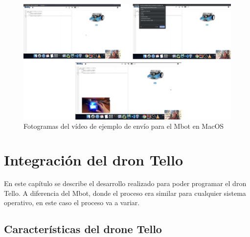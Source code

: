 \documentclass{report}
\begin{document}
\begin{figure}[h!]
  \centering
    \includegraphics[width=1\textwidth]{images/fotogramas_mbot.png}
  \caption{Fotogramas del vídeo de ejemplo de envío para el Mbot en MacOS}
  \label{Fotogramas del vídeo de ejemplo de envío para el Mbot en MacOS}
\end{figure}








\chapter{Integración del dron Tello}

En este capítulo se describe el desarrollo realizado para poder programar el dron Tello. A diferencia del Mbot, donde el proceso era similar para cualquier sistema operativo, en este caso el proceso va a variar.

\section{Características del drone Tello}
\end{document}
